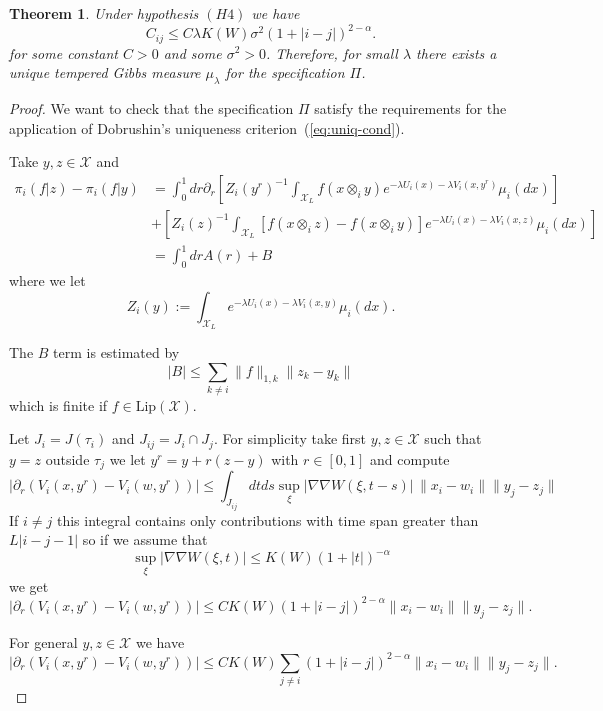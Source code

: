\documentclass[a4paper,12pt,reqno]{amsart}
\newtheorem{theorem}{Theorem}
\newcommand{\X}{\mathcal{X}}
\begin{document}
\begin{theorem}
\label{th:dobr}
Under hypothesis $(H4)$   we have
\begin{equation}
\label{eq:boundCthm}
C_{ij} \le C  \lambda K(W)  \sigma^2 
   (1+|i-j|)^{2-\alpha}.  
\end{equation}
for some constant $C>0$ and some $\sigma^2 > 0$.
Therefore, for small $\lambda$ there
exists a unique tempered Gibbs measure $\mu_\lambda$ for the
specification $\Pi$.
\end{theorem}
\begin{proof}
We want to check that the specification $\Pi$ satisfy the requirements
  for the application of Dobrushin's uniqueness criterion~(\ref{eq:uniq-cond}).

  Take $y,z \in \X$ and
\begin{equation*}
  \begin{split}
 \pi_i(f|z)-\pi_i(f|y) & = 
\int_0^1 dr \partial_r \left[Z_i(y^r)^{-1} \int_{\X_L}
  f(x \otimes_i y) e^{-\lambda U_i(x) -\lambda V_i(x,y^r)} \mu_i(dx)
  \right]
\\ & + \left[Z_i(z)^{-1} \int_{\X_L}
  [f(x \otimes_i z)-f(x \otimes_i y)] e^{-\lambda U_i(x) -\lambda
    V_i(x,z)} \mu_i(dx) \right]
\\ & = \int_0^1 dr A(r) + B
   \end{split}
\end{equation*}
where we let
$$
Z_i(y) := \int_{\X_L} e^{-\lambda U_i(x) -\lambda V_i(x,y)} \mu_i(dx).
$$


The $B$ term is estimated by 
\begin{equation}
 |B| \le  \sum_{k\neq i} \|f\|_{1,k} \|z_k-y_k\| 
\end{equation}
which is finite if $f \in \text{Lip}(\X)$. 

Let $J_i = J(\tau_i)$ and $J_{ij} = J_i
\cap J_j$. For simplicity take first $y,z \in \X$ such that $y=z$ outside $\tau_j$ we let
$y^r = y + r (z-y)$ with $r\in [0,1]$ and compute
$$
|\partial_r (V_i(x,y^r)-V_i(w,y^r))| \le \int_{J_{ij}} dt ds \sup_\xi
|\nabla \nabla W(\xi,t-s)|\, \|x_i-w_i\| \|y_j-z_j\|
$$ 
If $i \neq j$ this integral contains only contributions with time span
greater than $L|i-j-1|$ so if we assume that
$$
\sup_\xi |\nabla\nabla  W(\xi,t)| \le K(W) (1+|t|)^{-\alpha}
$$
we get
$$
|\partial_r (V_i(x,y^r)-V_i(w,y^r))| \le C K(W)  (1+|i-j|)^{2-\alpha}
\|x_i-w_i\| \|y_j-z_j\|. 
$$ 

For general $y,z \in \X$ we have
$$
|\partial_r (V_i(x,y^r)-V_i(w,y^r))| \le C K(W) \sum_{j \neq i} (1+|i-j|)^{2-\alpha} \|x_i-w_i\| \|y_j-z_j\|. 
$$ 



\end{proof}
\end{document}
